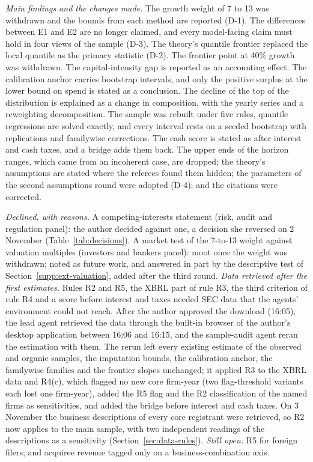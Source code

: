 \emph{Main findings and the changes made.} The growth weight of 7 to 13 was withdrawn and the bounds from each method are reported (D-1). The differences between E1 and E2 are no longer claimed, and every model-facing claim must hold in four views of the sample (D-3). The theory's quantile frontier replaced the local quantile as the primary statistic (D-2). The frontier point at 40\% growth was withdrawn. The capital-intensity gap is reported as an accounting effect. The calibration anchor carries bootstrap intervals, and only the positive surplus at the lower bound on spend is stated as a conclusion. The decline of the top of the distribution is explained as a change in composition, with the yearly series and a reweighting decomposition. The sample was rebuilt under five rules, quantile regressions are solved exactly, and every interval rests on a seeded bootstrap with \BootB{} replications and familywise corrections. The cash score is stated as after interest and cash taxes, and a bridge adds them back. The upper ends of the horizon ranges, which came from an incoherent case, are dropped; the theory's assumptions are stated where the referees found them hidden; the parameters of the second assumptions round were adopted (D-4); and the citations were corrected.

\emph{Declined, with reasons.} A competing-interests statement (risk, audit and regulation panel): the author decided against one, a decision she reversed on 2 November (Table~\ref{tab:decisions}). A market test of the 7-to-13 weight against valuation multiples (investors and bankers panel): moot once the weight was withdrawn; noted as future work, and answered in part by the descriptive test of Section~\ref{supp:ext-valuation}, added after the third round. \emph{Data retrieved after the first estimates.} Rules R2 and R5, the XBRL part of rule R3, the third criterion of rule R4 and a score before interest and taxes needed SEC data that the agents' environment could not reach. After the author approved the download (16:05), the lead agent retrieved the data through the built-in browser of the author's desktop application between 16:06 and 16:15, and the sample-audit agent reran the estimation with them. The rerun left every existing estimate of the observed and organic samples, the imputation bounds, the calibration anchor, the familywise families and the frontier slopes unchanged; it applied R3 to the XBRL data and R4(c), which flagged no new core firm-year (two flag-threshold variants each lost one firm-year), added the R5 flag and the R2 classification of the named firms as sensitivities, and added the bridge before interest and cash taxes. On 3 November the business descriptions of every core registrant were retrieved, so R2 now applies to the main sample, with two independent readings of the descriptions as a sensitivity (Section~\ref{sec:data-rules}). \emph{Still open:} R5 for foreign filers; and acquiree revenue tagged only on a business-combination axis.

